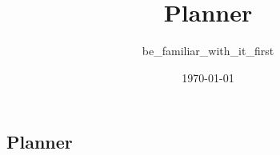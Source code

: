 

\title{Planner}
\date{\today}
\author{be\_familiar\_with\_it\_first}


{\let\newpage\relax\maketitle}
\newpage
\begin{center}
    \section*{\huge{Planner}}
\end{center}


